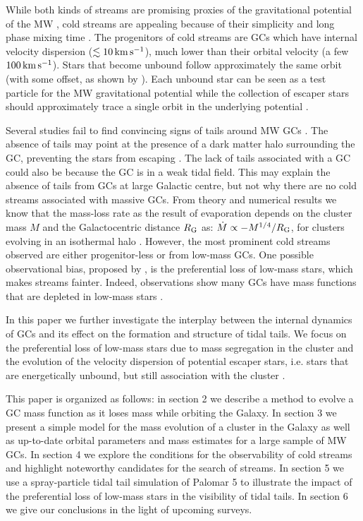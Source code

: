 \documentclass[useAMS,usenatbib,fleqn]{mnras}
\newcommand{\rg}{R_{\rm G}}
\newcommand{\kms}{{\rm km}\,{\rm s}^{-1}}
\newcommand{\comm}[1]{#1}
\begin{document}
While both kinds of streams are promising proxies of the gravitational potential
of the MW \citep[e.g.][]{Koposov10, 2014MNRAS.445.3788G}, cold streams are
appealing because of their simplicity and long phase mixing time
\citep{Helmi99}. The progenitors of cold streams are GCs which have internal
velocity dispersion ($\lesssim 10\,\kms$), much lower than their orbital
velocity (a few $100\,\kms$). Stars that become unbound follow approximately the
same orbit \comm{(with some offset, as shown by \citealt{Eyre09})}. Each unbound
star can be seen as a test particle for the MW gravitational potential while the
collection of escaper stars should approximately trace a single orbit in the
underlying potential \citep{Koposov10}. 

Several studies fail to find convincing signs of tails around MW GCs
\citep{Leon00, Kuzma16}. The absence of tails may point at the presence of a
dark matter halo surrounding the GC, preventing the stars from escaping
\citep{1996ApJ...461L..13M}.  The lack of tails associated with a GC could also
be because the GC is in a weak tidal field. This may explain the absence of
tails from GCs at large Galactic centre, but not why there are no cold streams
associated with massive GCs. From theory and numerical results we know that
\comm{the mass-loss rate as the result of evaporation depends on the cluster mass
$M$ and the Galactocentric distance $\rg$ as}: $\dot{M} \propto -M^{1/4}/R_{\rm
G}$, for clusters evolving in an isothermal halo \citep*{Baumgardt01, Gieles11}.
However, the most prominent cold streams observed are either progenitor-less or
from low-mass GCs. One possible observational bias, proposed by \citet{Leon00},
is the preferential loss of low-mass stars, which makes streams fainter. Indeed,
observations show many GCs have mass functions that are depleted in low-mass
stars \citep[see e.g.][]{Paust10}.

In this paper we further investigate the interplay between the internal dynamics
of GCs and its effect on the formation and structure of tidal tails. We focus on
the preferential loss of low-mass stars due to mass segregation in the cluster
and the evolution of the velocity dispersion of potential escaper stars,
\comm{i.e. stars that are energetically unbound, but still association with the
cluster \citep[see][]{2000MNRAS.318..753F}.}

This paper is organized as follows: in section 2 we describe a method to evolve
a GC mass function as it loses mass while orbiting the Galaxy. In section 3 we
present a simple model for the mass evolution of a cluster in the Galaxy as well
as up-to-date orbital parameters and mass estimates for a large sample of MW
GCs. In section 4 we explore the conditions for the observability of cold
streams and highlight noteworthy candidates for the search of streams. In
section 5 we use a spray-particle tidal tail simulation of Palomar 5 to
illustrate the impact of the preferential loss of low-mass stars in the
visibility of tidal tails. In section 6 we give our conclusions in the light of
upcoming surveys. 
\end{document}
